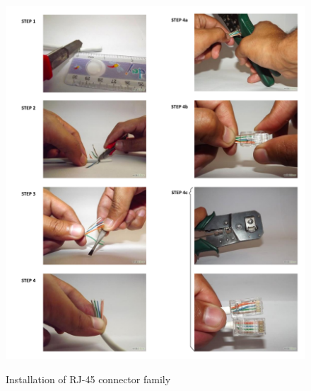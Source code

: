 \begin{figure}
  \centering
  \includegraphics[angle=90,width=1\columnwidth]{figs/body03/FIGCRIMPRJ45.pdf}\\
  \caption[Installation of RJ-45 connector family]{Installation of RJ-45 connector family}
  \label{FIG:CRIMPRJ45}
\end{figure}
